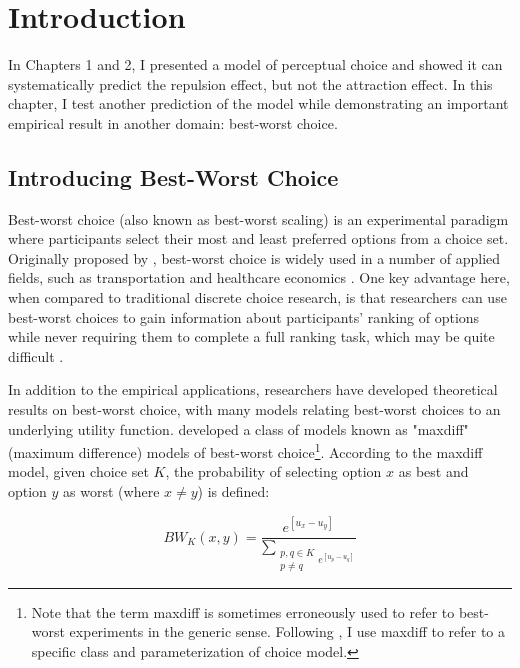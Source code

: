 \section{Introduction}

In Chapters 1 and 2, I presented a model of perceptual choice and showed it can systematically predict the repulsion effect, but not the attraction effect. In this chapter, I test another prediction of the model while demonstrating an important empirical result in another domain: best-worst choice.

\subsection{Introducing Best-Worst Choice}

Best-worst choice (also known as best-worst scaling) is an experimental paradigm where participants select their most and least preferred options from a choice set. Originally proposed by \textcite{finn1992determining}, best-worst choice is widely used in a number of applied fields, such as transportation \parencite{beck2016best} and healthcare economics \parencite{cheung2016using,flynn2007best}. One key advantage here, when compared to traditional discrete choice research, is that researchers can use best-worst choices to gain information about participants' ranking of options while never requiring them to complete a full ranking task, which may be quite difficult \parencite{marleyProbabilisticModelsBest2005}.

In addition to the empirical applications, researchers have developed theoretical results on best-worst choice, with many models relating best-worst choices to an underlying utility function. \textcite{marleyProbabilisticModelsBest2005} developed a class of models known as "maxdiff" (maximum difference) models of best-worst choice\footnote{Note that the term maxdiff is sometimes erroneously used to refer to best-worst experiments in the generic sense. Following \textcite{marleyProbabilisticModelsBest2005}, I use maxdiff to refer to a specific class and parameterization of choice model.}. According to the maxdiff model, given choice set $K$, the probability of selecting option $x$ as best and option $y$ as worst (where $x \neq y$) is defined\parencite{hawkinsIntegratingCognitiveProcess2014a}:

\begin{equation}
   BW_{K}(x,y)=\frac{e^[u_{x}-u_{y}]}{\sum_{\substack{{p,q}\in K\\p \neq q} e^[u_{p}-u_{q}]}}
   \label{maxdiff_equation}
\end{equation}

